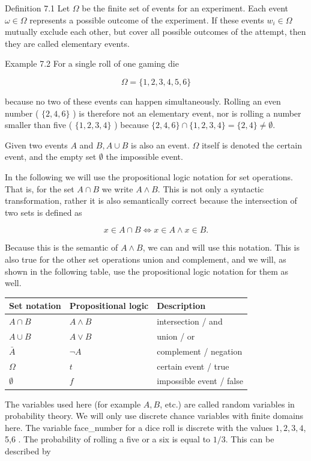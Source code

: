 \documentclass[10pt]{book}
\begin{document}
Definition 7.1 Let $\Omega$ be the finite set of events for an experiment. Each event $\omega \in \Omega$ represents a possible outcome of the experiment. If these events $w_{i} \in \Omega$ mutually exclude each other, but cover all possible outcomes of the attempt, then they are called elementary events.

Example 7.2 For a single roll of one gaming die


$$
\Omega=\{1,2,3,4,5,6\}
$$

because no two of these events can happen simultaneously. Rolling an even number ( $\{2,4,6\}$ ) is therefore not an elementary event, nor is rolling a number smaller than five ( $\{1,2,3,4\}$ ) because $\{2,4,6\} \cap\{1,2,3,4\}=\{2,4\} \neq \emptyset$.

Given two events $A$ and $B, A \cup B$ is also an event. $\Omega$ itself is denoted the certain event, and the empty set $\emptyset$ the impossible event.

In the following we will use the propositional logic notation for set operations. That is, for the set $A \cap B$ we write $A \wedge B$. This is not only a syntactic transformation, rather it is also semantically correct because the intersection of two sets is defined as

$$
x \in A \cap B \Leftrightarrow x \in A \wedge x \in B .
$$

Because this is the semantic of $A \wedge B$, we can and will use this notation. This is also true for the other set operations union and complement, and we will, as shown in the following table, use the propositional logic notation for them as well.

\begin{center}
\begin{tabular}{|l|l|l|}
\hline
Set notation & Propositional logic & Description \\
\hline
$A \cap B$ & $A \wedge B$ & intersection / and \\
\hline
$A \cup B$ & $A \vee B$ & union / or \\
\hline
$\bar{A}$ & $\neg A$ & complement / negation \\
\hline
$\Omega$ & $t$ & certain event / true \\
\hline
$\emptyset$ & $f$ & impossible event / false \\
\hline
\end{tabular}
\end{center}

The variables used here (for example $A, B$, etc.) are called random variables in probability theory. We will only use discrete chance variables with finite domains here. The variable face\_number for a dice roll is discrete with the values $1,2,3,4$, 5,6 . The probability of rolling a five or a six is equal to $1 / 3$. This can be described by
\end{document}
